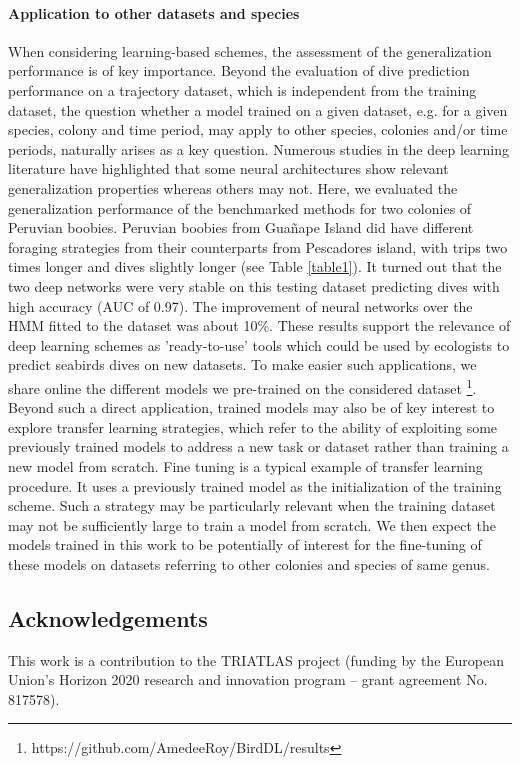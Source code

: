 \documentclass{article}
\begin{document}
\paragraph{Application to other datasets and species}
When considering learning-based schemes, the assessment of the generalization performance is of key importance. Beyond the evaluation of dive prediction performance on a trajectory dataset, which is independent from the training dataset, the question whether a model trained on a given dataset, e.g. for a given species, colony and time period, may apply to other species, colonies and/or time periods, naturally arises as a key question. Numerous studies in the deep learning literature \citep{kawaguchi_generalization_2020,zhang_understanding_2017} have highlighted that some neural architectures show relevant generalization properties whereas others may not.
Here, we evaluated the generalization performance of the benchmarked methods for two colonies of Peruvian boobies.
Peruvian boobies from  Guañape Island did have different foraging strategies from their counterparts from Pescadores island, with trips two times longer and dives slightly longer (see Table \ref{table1}). It turned out that the two deep networks were very stable on this testing dataset predicting dives with high accuracy (AUC of 0.97). The improvement of neural networks over the HMM fitted to the dataset was about 10\%.
These results support the relevance of deep learning schemes as
'ready-to-use' tools which could be used by ecologists to predict
seabirds dives on new datasets. To make easier such applications, we share online the different models we pre-trained on the considered dataset \footnote{https://github.com/AmedeeRoy/BirdDL/results}.
Beyond such a direct application, trained models may also be of key interest to explore transfer learning strategies, which refer to the ability of exploiting some previously trained models to address a new task or dataset rather than training a new model from scratch. Fine tuning is a typical example of transfer learning procedure. It uses a previously trained model as the initialization of the training scheme. Such a strategy may be particularly relevant when the training dataset may not be sufficiently large to train a model from scratch. We then expect the models trained in this work to be potentially of interest for the fine-tuning of these models on datasets referring to other colonies and species of same genus.

\subsection*{Acknowledgements}
This work is a contribution to the TRIATLAS project (funding by the European Union's Horizon 2020 research and innovation program – grant agreement No. 817578).
\end{document}

